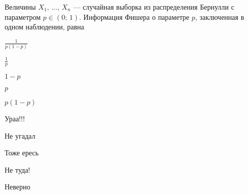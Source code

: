 
\begin{question}
Величины \(X_1, \, \ldots, \, X_n\) — случайная выборка из
распределения Бернулли с параметром \(p \in (0;\,1)\). Информация Фишера
о параметре \(p\), заключенная в одном наблюдении, равна
\begin{answerlist}
  \item \(\frac{1}{p(1-p)}\)
  \item \(\frac{1}{p}\)
  \item \(1 - p\)
  \item \(p\)
  \item \(p(1-p)\)
\end{answerlist}
\end{question}

\begin{solution}
\begin{answerlist}
  \item Ураа!!!
  \item Не угадал
  \item Тоже ересь
  \item Не туда!
  \item Неверно
\end{answerlist}
\end{solution}


